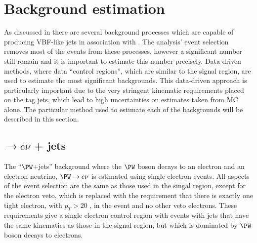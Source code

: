 \section{Background estimation}%
\label{sec:promptbkg}
As discussed in  there are several background processes which are capable of producing VBF-like jets in association with \MET. The analysis' event selection removes most of the events from these processes, however a significant number still remain and it is important to estimate this number precisely. Data-driven methods, where data ``control regions'', which are similar to the signal region, are used to estimate the most significant backgrounds. This data-driven approach is particularly important due to the very stringent kinematic requirements placed on the tag jets, which lead to high uncertainties on estimates taken from \ac{MC} alone. The particular method used to estimate each of the backgrounds will be described in this section.

\subsection{\PW$\rightarrow e\nu$ + jets}
\label{sec:promptwenu}
The ``$\PW$+jets'' background where the $\PW$ boson decays to an electron and an electron neutrino, $\PW\rightarrow e\nu$ is estimated using single electron events. All aspects of the event selection are the same as those used in the singal region, except for the electron veto, which is replaced with the requirement that there is exactly one tight electron, with $p_{T}>20$ \GeV, in the event and no other veto electrons. These requirements give a single electron control region with events with jets that have the same kinematics as those in the signal region, but which is dominated by $\PW$ boson decays to electrons.

